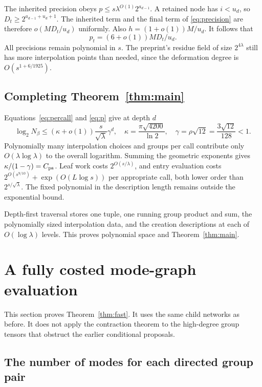 \documentclass[11pt,letterpaper]{article}
\theoremstyle{definition}\newtheorem{definition}[theorem]{Definition}
\theoremstyle{remark}\newtheorem{remark}[theorem]{Remark}
\begin{document}
The inherited precision obeys
$p\le s\lambda^{O(1)}2^{a_{d-1}}$. A retained node has $i<u_d$, so
$D_t\ge2^{a_{d-1}+u_d+1}$. The inherited term and the final term of
\eqref{eq:precision} are therefore $o(MD_t/u_d)$ uniformly.
Also $h=(1+o(1))M/u_d$. It follows that
\begin{equation}\label{eq:p}
 p_t=(6+o(1))MD_t/u_d.
\end{equation}
All precisions remain polynomial in $s$. The preprint's residue field of
size $2^{4\lambda}$ still has more interpolation points than needed, since
the deformation degree is $O(s^{1+6/1925})$.

\subsection{Completing Theorem~\ref{thm:main}}

Equations~\eqref{eq:percall} and \eqref{eq:p} give at depth $d$
\[
 \log_2N_\beta\le(\kappa+o(1))
       \frac{s}{\sqrt\lambda}\gamma^d,
 \quad \kappa=\frac{\pi\sqrt{4200}}{\ln2},
 \quad\gamma=\rho\sqrt{12}=\frac{3\sqrt{12}}{128}<1.
\]
Polynomially many interpolation choices and groups per call contribute
only $O(\lambda\log\lambda)$ to the overall logarithm. Summing the
geometric exponents gives $\kappa/(1-\gamma)=C_{\rm ps}$.
Leaf work costs $2^{O(s/\lambda)}$, and entry evaluation costs
$2^{O(s^{9/10})}+\exp(O(L\log s))$ per appropriate call, both lower
order than $2^{s/\sqrt\lambda}$. The fixed polynomial in the description
length remains outside the exponential bound.

Depth-first traversal stores one tuple, one running group product and sum,
the polynomially sized interpolation data, and the creation descriptions
at each of $O(\log\lambda)$ levels. This proves polynomial space and
Theorem~\ref{thm:main}.

\section{A fully costed mode-graph evaluation}
\label{sec:modegraph}

This section proves Theorem~\ref{thm:fast}. It uses the same child networks
as before. It does not apply the contraction theorem to the high-degree
group tensors that obstruct the earlier conditional proposals.

\subsection{The number of modes for each directed group pair}
\end{document}
